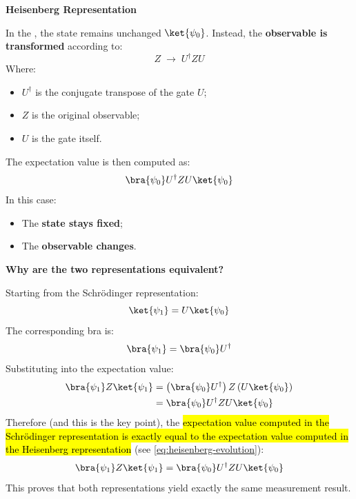\highspace
\begin{flushleft}
    \textcolor{Green3}{ \textbf{Heisenberg Representation}}
\end{flushleft}
In the , the state remains unchanged $\ket{\psi_0}$.
Instead, the \textbf{observable is transformed} according to:
\begin{equation}\label{eq:heisenberg-evolution}
    Z
    \;\longrightarrow\;
    U^\dagger Z U
\end{equation}
Where:
\begin{itemize}
    \item $U^{\dagger}$ is the conjugate transpose of the gate $U$;
    \item $Z$ is the original observable;
    \item $U$ is the gate itself.
\end{itemize}
The expectation value is then computed as:
\begin{equation*}
    \bra{\psi_0}
    U^\dagger Z U
    \ket{\psi_0}
\end{equation*}
In this case:
\begin{itemize}
    \item The \textbf{state stays fixed};
    \item The \textbf{observable changes}.
\end{itemize}

\highspace
\begin{flushleft}
    \textcolor{Green3}{ \textbf{Why are the two representations equivalent?}}
\end{flushleft}
Starting from the Schrödinger representation:
\begin{equation*}
    \ket{\psi_1}
    =
    U\ket{\psi_0}
\end{equation*}
The corresponding bra is:
\begin{equation*}
    \bra{\psi_1}
    =
    \bra{\psi_0} U^\dagger
\end{equation*}
Substituting into the expectation value:
\begin{align*}
    \bra{\psi_1} Z \ket{\psi_1}
    &=
    \left(\bra{\psi_0} U^\dagger\right)
    Z
    \left(U\ket{\psi_0}\right)
    \\
    &=
    \bra{\psi_0}
    U^\dagger Z U
    \ket{\psi_0}
\end{align*}
Therefore (and this is the key point), the \hl{expectation value computed in the Schrödinger representation is exactly equal to the expectation value computed in the Heisenberg representation} (see \autoref{eq:heisenberg-evolution}):
\begin{equation}\label{eq:schrodinger-heisenberg-equivalence}
    \bra{\psi_1} Z \ket{\psi_1}
    =
    \bra{\psi_0}
    U^\dagger Z U
    \ket{\psi_0}
\end{equation}
This proves that both representations yield exactly the same measurement result.

